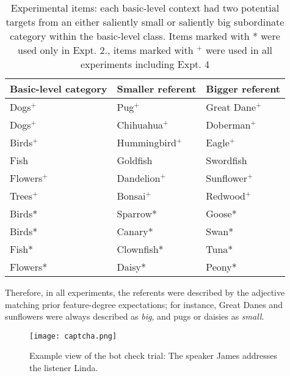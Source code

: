 \begin{table}[t]
	\small{
		\begin{center}
			\caption{Experimental items: each basic-level context had two potential targets from an either saliently small or saliently big subordinate category within the basic-level class. Items marked with * were used only in Expt. 2., items marked with $^{+}$ were used in all experiments including Expt. 4}
			\label{tab:stimuli}
			\vskip 0.12in
			\fontsize{10}{11}\selectfont
			\begin{tabularx}{\textwidth}{XXX}
				\hline
				Basic-level category & Smaller referent & Bigger referent\\
				\hline
				Dogs$^+$ & Pug$^+$ & Great Dane$^+$ \\
				Dogs$^+$ & Chihuahua$^+$ & Doberman$^+$\\
				Birds$^+$ & Hummingbird$^+$ & Eagle$^+$  \\
				Fish & Goldfish & Swordfish \\
				Flowers$^+$ & Dandelion$^+$ & Sunflower$^+$\\
				Trees$^+$ & Bonsai$^+$ & Redwood$^+$\\
				Birds* & Sparrow* & Goose* \\
				Birds* & Canary* & Swan* \\
				Fish* & Clownfish* & Tuna* \\
				Flowers* & Daisy* & Peony* \\
				\hline     
			\end{tabularx}
		\end{center}
	}
\end{table}
Therefore, in all experiments, the referents were described by the adjective matching prior feature-degree expectations; for instance, Great Danes and sunflowers were always described as \textit{big}, and pugs or daisies as \textit{small}. 

\begin{figure*}[t]
	\begin{center}
		\texttt{[image: captcha.png]}
	\end{center}
	\caption{Example view of the bot check trial: The speaker James addresses the listener Linda.}
	\label{captcha}
\end{figure*}

